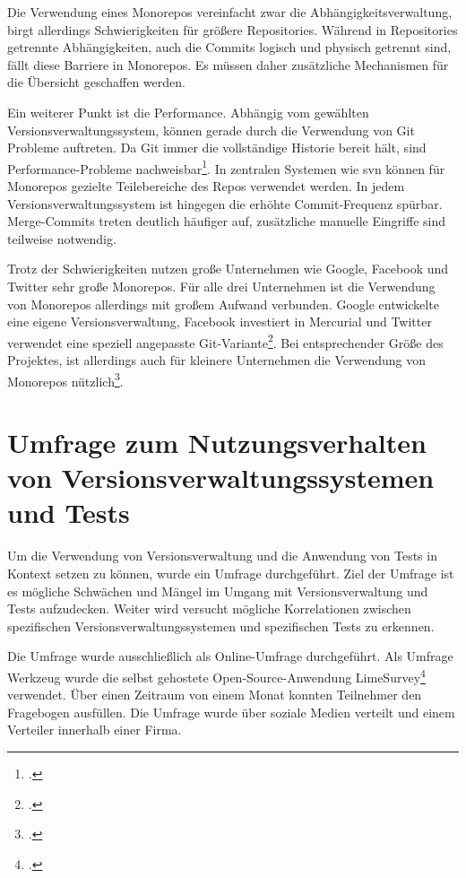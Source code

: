 Die Verwendung eines Monorepos vereinfacht zwar die Abhängigkeitsverwaltung, birgt allerdings Schwierigkeiten für größere Repositories. Während in Repositories getrennte Abhängigkeiten, auch die Commits logisch und physisch getrennt sind, fällt diese Barriere in Monorepos. Es müssen daher zusätzliche Mechanismen für die Übersicht geschaffen werden.

Ein weiterer Punkt ist die Performance. Abhängig vom gewählten Versionsverwaltungssystem, können gerade durch die Verwendung von Git Probleme auftreten. Da Git immer die vollständige Historie bereit hält, sind Performance-Probleme nachweisbar\footcite{atlassian-monorepo-git}. In zentralen Systemen wie \acs{svn} können für Monorepos gezielte Teilebereiche des Repos verwendet werden. 
In jedem Versionsverwaltungssystem ist hingegen die erhöhte Commit-Frequenz spürbar. Merge-Commits treten deutlich häufiger auf, zusätzliche manuelle Eingriffe sind teilweise notwendig.

Trotz der Schwierigkeiten nutzen große Unternehmen wie Google, Facebook und Twitter sehr große Monorepos. Für alle drei Unternehmen ist die Verwendung von Monorepos allerdings mit großem Aufwand verbunden. Google entwickelte eine eigene Versionsverwaltung, Facebook investiert in Mercurial und Twitter verwendet eine speziell angepasste Git-Variante\footcite{monorepos-wild}.
Bei entsprechender Größe des Projektes, ist allerdings auch für kleinere Unternehmen die Verwendung von Monorepos nützlich\footcite{hackernoon-positive-monorepo}.

\section{Umfrage zum Nutzungsverhalten von Versionsverwaltungssystemen und Tests}
\label{survey-vcs-test}

Um die Verwendung von Versionsverwaltung und die Anwendung von Tests in Kontext setzen zu können, wurde ein Umfrage durchgeführt.
Ziel der Umfrage ist es mögliche Schwächen und Mängel im Umgang mit Versionsverwaltung und Tests aufzudecken. Weiter wird versucht mögliche Korrelationen zwischen spezifischen Versionsverwaltungssystemen und spezifischen Tests zu erkennen.

Die Umfrage wurde ausschließlich als Online-Umfrage durchgeführt. Als Umfrage Werkzeug wurde die selbst gehostete Open-Source-Anwendung \glqq LimeSurvey\grqq{}\footcite[][]{limesurvey} verwendet. Über einen Zeitraum von einem Monat konnten Teilnehmer den Fragebogen ausfüllen. Die Umfrage wurde über soziale Medien verteilt und einem Verteiler innerhalb einer Firma.

